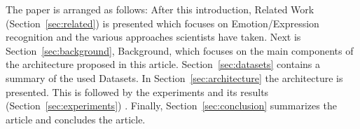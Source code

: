 The paper is arranged as follows: After this introduction, Related Work (Section~\ref{sec:related}) is presented which focuses on Emotion/Expression recognition and the various approaches scientists have taken. Next is Section~\ref{sec:background}, Background, which focuses on the main components of the architecture proposed in this article. Section~\ref{sec:datasets} contains a summary of the used Datasets. In Section~\ref{sec:architecture} the architecture is presented. This is followed by the experiments and its results (Section~\ref{sec:experiments}) . Finally, Section~\ref{sec:conclusion} summarizes the article and concludes the article.